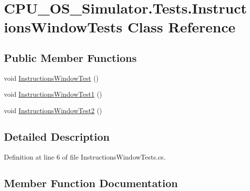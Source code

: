\hypertarget{class_c_p_u___o_s___simulator_1_1_tests_1_1_instructions_window_tests}{}\section{C\+P\+U\+\_\+\+O\+S\+\_\+\+Simulator.\+Tests.\+Instructions\+Window\+Tests Class Reference}
\label{class_c_p_u___o_s___simulator_1_1_tests_1_1_instructions_window_tests}
\subsection*{Public Member Functions}
\begin{DoxyCompactItemize}
\item 
void \hyperlink{class_c_p_u___o_s___simulator_1_1_tests_1_1_instructions_window_tests_a2b346fb408ca259eae0f0ea8601329a2}{Instructions\+Window\+Test} ()
\item 
void \hyperlink{class_c_p_u___o_s___simulator_1_1_tests_1_1_instructions_window_tests_aeaf3021b4b5db5d689a153354defea18}{Instructions\+Window\+Test1} ()
\item 
void \hyperlink{class_c_p_u___o_s___simulator_1_1_tests_1_1_instructions_window_tests_ac2b4b0a184b5d0f43e817465f0b11217}{Instructions\+Window\+Test2} ()
\end{DoxyCompactItemize}


\subsection{Detailed Description}


Definition at line 6 of file Instructions\+Window\+Tests.\+cs.



\subsection{Member Function Documentation}
\hypertarget{class_c_p_u___o_s___simulator_1_1_tests_1_1_instructions_window_tests_a2b346fb408ca259eae0f0ea8601329a2}{}
